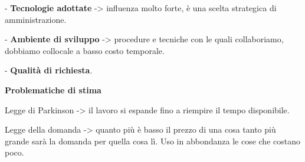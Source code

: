 - \textbf{Tecnologie adottate} -> influenza molto forte, è una scelta strategica di amministrazione.

- \textbf{Ambiente di sviluppo} -> procedure e tecniche con le quali collaboriamo, dobbiamo collocale a basso costo temporale.

- \textbf{Qualità di richiesta}.

\textbf{Problematiche di stima}

Legge di Parkinson -> il lavoro si espande fino a riempire il tempo disponibile.

Legge della domanda -> quanto più è basso il prezzo di una cosa tanto più grande sarà la domanda per quella cosa lì. Uso in abbondanza le cose che costano poco.

